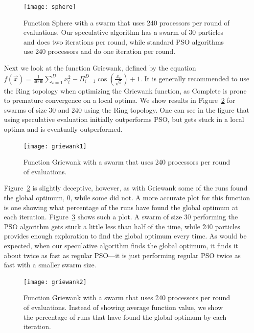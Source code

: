 \documentclass[journal,letterpaper]{IEEEtran}
\newcommand{\fig}[1]{Figure~\ref{fig:#1}}
\begin{document}
\begin{figure}
  \centering
  \texttt{[image: sphere]}
  \caption{Function Sphere with a swarm that uses 240 processors per round of
  evaluations.  Our speculative algorithm has a swarm of 30 particles and does
  two iterations per round, while standard PSO algorithms use 240 processors
  and do one iteration per round.}
  \label{fig:basic-sphere}
\end{figure}

Next we look at the function Griewank, defined by the equation $f(\Vec{x}) =
\frac{1}{4000} \sum_{i=1}^D x_i^2 - \Pi_{i=1}^D \cos\left(\frac{x_i}{\sqrt{i}}
\right) + 1$.  It is generally recommended to use the Ring topology when
optimizing the Griewank function, as Complete is prone to premature convergence
on a local optima.  We show results in \fig{basic-griewank1} for swarms of size
30 and 240 using the Ring topology. One can see in the figure that using
speculative evaluation initially outperforms PSO, but gets stuck in a local
optima and is eventually outperformed.  

\begin{figure}
  \centering
  \texttt{[image: griewank1]}
  \caption{Function Griewank with a swarm that uses 240 processors per round of
  evaluations.}
  \label{fig:basic-griewank1}
\end{figure}

\fig{basic-griewank1} is slightly deceptive, however, as with Griewank some of
the runs found the global optimum, 0, while some did not.  A more accurate plot
for this function is one showing what percentage of the runs have found the
global optimum at each iteration.  \fig{basic-griewank2} shows such a plot.  A
swarm of size 30 performing the PSO algorithm gets stuck a little less than
half of the time, while 240 particles provides enough exploration to find the
global optimum every time.  As would be expected, when our speculative
algorithm finds the global optimum, it finds it about twice as fast as regular
PSO---it is just performing regular PSO twice as fast with a smaller swarm
size.

\begin{figure}
  \centering
  \texttt{[image: griewank2]}
  \caption{Function Griewank with a swarm that uses 240 processors per round of
  evaluations.  Instead of showing average function value, we show the
  percentage of runs that have found the global optimum by each iteration.}
  \label{fig:basic-griewank2}
\end{figure}
\end{document}
